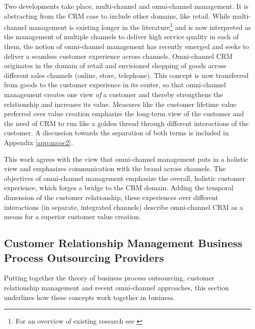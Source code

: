 		Two developments take place, multi-channel and omni-channel management. It is abstracting from the CRM case to include other domains, like retail. While multi-channel management is existing longer in the literature\footnote{For an overview of existing research see \citep{Neslin_2009}} and is now interpreted as the management of multiple channels to deliver high service quality in each of them, the notion of omni-channel management has recently emerged and seeks to deliver a seamless customer experience across channels. Omni-channel CRM originates in the domain of retail \citep{Brynjolfsson20131, rigby2011, Piotrowicz_2014} and envisioned shopping of goods across different sales channels (\ie online, store, telephone). This concept is now transferred from goods to the customer experience in its center, so that omni-channel management creates one view \textit{of} a customer and thereby strengthens the relationship and increases its value. Measures like the customer lifetime value preferred over value creation emphasize the long-term view of the customer \citep{Lemon_2016} and the need of CRM to run like a golden thread through different interactions of the customer. A discussion towards the separation of both terms is included in Appendix \ref{app:mcoc2}.
		
	 This work agrees with the view that omni-channel management puts in a holistic view and emphasizes communication with the brand across channels. The objectives of omni-channel management emphasize the overall, holistic customer experience, which forges a bridge to the \acrshort{CRM} domain. Adding the temporal dimension of the customer relationship, these experiences over different interactions (in separate, integrated channels) describe omni-channel \acrshort{CRM} as a means for a superior customer value creation. 
	 
	
		\subsection{Customer Relationship Management Business Process Outsourcing Providers}
		\label{sec:bpocrmis}
		Putting together the theory of business process outsourcing, customer relationship management and recent omni-channel approaches, this section underlines how these concepts work together in business. 
		
